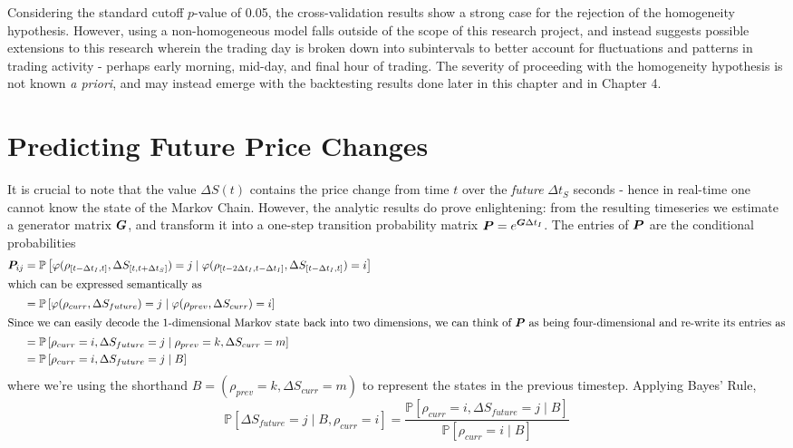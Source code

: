 Considering the standard cutoff $p$-value of 0.05, the cross-validation results show a strong case for the rejection of the homogeneity hypothesis. However, using a non-homogeneous model falls outside of the scope of this research project, and instead suggests possible extensions to this research wherein the trading day is broken down into subintervals to better account for fluctuations and patterns in trading activity - perhaps early morning, mid-day, and final hour of trading. The severity of proceeding with the homogeneity hypothesis is not known \textit{a priori}, and may instead emerge with the backtesting results done later in this chapter and in Chapter 4.

\section{Predicting Future Price Changes}
It is crucial to note that the value $\Delta S(t)$ contains the price change from time $t$ over the \textit{future} $\Delta t_S$ seconds - hence in real-time one cannot know the state of the Markov Chain. However, the analytic results do prove enlightening: from the resulting timeseries we estimate a generator matrix $\boldsymbol{G}$, and transform it into a one-step transition probability matrix $\boldsymbol{P} = e^{\boldsymbol{G}\Delta t_I}$. The entries of $\boldsymbol{P}$ are the conditional probabilities 
\begin{align}
\boldsymbol{P}_{ij} & = \mathbb{P}\left[ \varphi( \rho_{[t-\Delta t_I, t]}, \Delta S_{[t,t+\Delta t_S]}) = j \; | \; \varphi( \rho_{[t-2\Delta t_I, t-\Delta t_I]}, \Delta S_{[t-\Delta t_I, t]} ) = i \right] \label{eq:POneStepUgly} \\
\intertext{which can be expressed semantically as}
& = \mathbb{P}\left[ \varphi( \rho_{curr}, \Delta S_{future}) = j \; | \; \varphi( \rho_{prev}, \Delta S_{curr} ) = i \right] \label{eq:POneStepNice} \\
\intertext{Since we can easily decode the 1-dimensional Markov state back into two dimensions, we can think of $\boldsymbol{P}$ as being four-dimensional and re-write its entries as}
& = \mathbb{P}\left[ \rho_{curr} = i,  \Delta S_{future} = j \; | \; \rho_{prev} = k, \Delta S_{curr} = m \right] \\
& = \mathbb{P}\left[ \rho_{curr} = i,  \Delta S_{future} = j \; | \; B \right]
\end{align}
where we're using the shorthand $B = (\rho_{prev} = k, \Delta S_{curr} = m)$ to represent the states in the previous timestep. Applying Bayes' Rule,
\begin{equation}\label{eq:POneStepBayes}
\mathbb{P}\left[ \Delta S_{future} = j \; | \; B, \rho_{curr} = i \right] = \dfrac{\mathbb{P}\left[ \rho_{curr} = i, \Delta S_{future} = j \; | \; B \right]}{\mathbb{P}\left[ \rho_{curr} = i \; | \; B \right]}
\end{equation}
